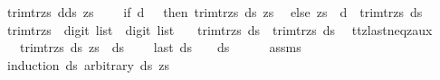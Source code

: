 \begin{isabellebody}
{\isacharbar}{\kern0pt}\ {\isachardoublequoteopen}trim{\isacharunderscore}{\kern0pt}tr{\isacharunderscore}{\kern0pt}zs{\isacharprime}{\kern0pt}\ {\isacharparenleft}{\kern0pt}d{\isacharhash}{\kern0pt}ds{\isacharparenright}{\kern0pt}\ zs\ {\isacharequal}{\kern0pt}\ \isanewline
\ \ {\isacharparenleft}{\kern0pt}if\ d\ {\isacharequal}{\kern0pt}\ {}\ then\ trim{\isacharunderscore}{\kern0pt}tr{\isacharunderscore}{\kern0pt}zs{\isacharprime}{\kern0pt}\ ds\ {\isacharparenleft}{\kern0pt}{}{\isacharhash}{\kern0pt}zs{\isacharparenright}{\kern0pt}\isanewline
\ \ else\ zs\ {\isacharat}{\kern0pt}\ d\ {\isacharhash}{\kern0pt}\ {\isacharparenleft}{\kern0pt}trim{\isacharunderscore}{\kern0pt}tr{\isacharunderscore}{\kern0pt}zs{\isacharprime}{\kern0pt}\ ds\ {\isacharbrackleft}{\kern0pt}{\isacharbrackright}{\kern0pt}{\isacharparenright}{\kern0pt}{\isacharparenright}{\kern0pt}{\isachardoublequoteclose}\isanewline
\isanewline
{}\isamarkupfalse%
\ trim{\isacharunderscore}{\kern0pt}tr{\isacharunderscore}{\kern0pt}zs\ {\isacharcolon}{\kern0pt}{\isacharcolon}{\kern0pt}\ {\isachardoublequoteopen}digit\ list\ {\isasymRightarrow}\ digit\ list{\isachardoublequoteclose}\ \isanewline
\ \ {\isachardoublequoteopen}trim{\isacharunderscore}{\kern0pt}tr{\isacharunderscore}{\kern0pt}zs\ ds\ {\isacharequal}{\kern0pt}\ trim{\isacharunderscore}{\kern0pt}tr{\isacharunderscore}{\kern0pt}zs{\isacharprime}{\kern0pt}\ ds\ {\isacharbrackleft}{\kern0pt}{\isacharbrackright}{\kern0pt}{\isachardoublequoteclose}\isanewline
\isanewline
{}\isamarkupfalse%
\ ttz{\isacharunderscore}{\kern0pt}last{\isacharunderscore}{\kern0pt}neq{\isacharunderscore}{\kern0pt}z{\isacharunderscore}{\kern0pt}aux{\isacharcolon}{\kern0pt}\ \isanewline
\ \ \ {\isachardoublequoteopen}trim{\isacharunderscore}{\kern0pt}tr{\isacharunderscore}{\kern0pt}zs{\isacharprime}{\kern0pt}\ ds\ zs\ {\isacharequal}{\kern0pt}\ ds{\isacharprime}{\kern0pt}{\isachardoublequoteclose}\ \isanewline
\ \ \ {\isachardoublequoteopen}last\ ds{\isacharprime}{\kern0pt}\ {\isasymnoteq}\ {}\ {\isasymor}\ ds{\isacharprime}{\kern0pt}\ {\isacharequal}{\kern0pt}\ {\isacharbrackleft}{\kern0pt}{\isacharbrackright}{\kern0pt}{\isachardoublequoteclose}\isanewline
%
\isadelimproof
\ \ %
\endisadelimproof
%
\isatagproof
{}\isamarkupfalse%
\ assms\isanewline
{}\isamarkupfalse%
\ {\isacharparenleft}{\kern0pt}induction\ ds\ arbitrary{\isacharcolon}{\kern0pt}\ ds{\isacharprime}{\kern0pt}\ zs{\isacharparenright}{\kern0pt}\isanewline

\end{isabellebody}
